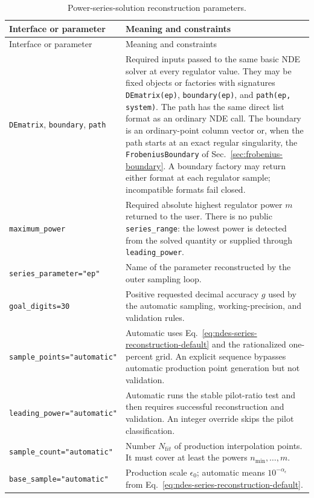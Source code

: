 \documentclass[11pt]{article}
\newcommand{\eps}{\epsilon}
\begin{document}
\small
\begin{longtable}{L{0.36\textwidth}L{0.58\textwidth}}
\caption{Power-series-solution reconstruction parameters.}\label{tab:regulator-api}\\
\toprule
Interface or parameter & Meaning and constraints \\
\midrule
\endfirsthead
\toprule
Interface or parameter & Meaning and constraints \\
\midrule
\endhead
\texttt{DEmatrix}, \texttt{boundary}, \texttt{path} & Required inputs passed to the same
basic NDE solver at every regulator value.  They may be fixed objects or factories with
signatures \texttt{DEmatrix(ep)}, \texttt{boundary(ep)}, and
\texttt{path(ep, system)}.  The path has the same direct list format as an ordinary NDE call.
The boundary is an ordinary-point column vector or, when the path starts at an exact regular
singularity, the \texttt{FrobeniusBoundary} of Sec.~\ref{sec:frobenius-boundary}.  A boundary
factory may return either format at each regulator sample; incompatible formats fail closed. \\
\texttt{maximum\_power} & Required absolute highest regulator power $m$ returned to the user.
There is no public \texttt{series\_range}: the lowest power is detected from the solved
quantity or supplied through \texttt{leading\_power}. \\
\texttt{series\_parameter="ep"} & Name of the parameter reconstructed by the outer sampling
loop. \\
\texttt{goal\_digits=30} & Positive requested decimal accuracy $g$ used by the automatic
sampling, working-precision, and validation rules. \\
\texttt{sample\_points="automatic"} & Automatic uses Eq.~\eqref{eq:ndes-series-reconstruction-default}
and the rationalized one-percent grid.  An explicit sequence bypasses automatic production
point generation but not validation. \\
\texttt{leading\_power="automatic"} & Automatic runs the stable pilot-ratio test and then
requires successful reconstruction and validation.  An integer override skips the pilot
classification. \\
\texttt{sample\_count="automatic"} & Number $N_{\mathrm fit}$ of production interpolation
points.  It must cover at least the powers $n_{\min},\ldots,m$. \\
\texttt{base\_sample="automatic"} & Production scale $\eps_0$; automatic means
$10^{-\alpha_\eps}$ from Eq.~\eqref{eq:ndes-series-reconstruction-default}. \\

\end{longtable}
\end{document}
